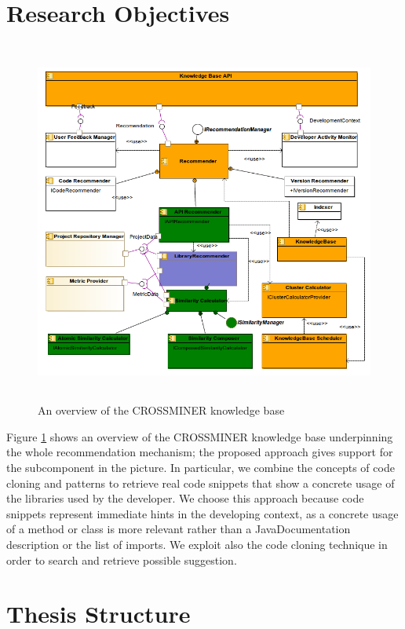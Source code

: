 \section{Research Objectives}
\begin{figure}[!h]
	\includegraphics[width=12cm,height=12cm,keepaspectratio]{images/Kb.png}
	\centering
	\caption{An overview of the CROSSMINER knowledge base}
	\label{fig:crossminerKB}
\end{figure}

Figure \ref{fig:crossminerKB} shows an overview of the 
CROSSMINER 
knowledge base underpinning the whole recommendation 
mechanism; the proposed 
approach gives support for the  
subcomponent in the 
picture. In particular, we combine the concepts of code 
cloning and patterns to 
retrieve real code snippets that show a concrete usage of the 
libraries used by 
the developer. We choose this approach because code snippets 
represent 
immediate hints in the developing context, as a concrete 
usage of a method or 
class is more relevant rather than a JavaDocumentation 
description or the list 
of imports. We exploit also the code cloning technique in 
order to search and 
retrieve possible suggestion.

\section{Thesis Structure}

